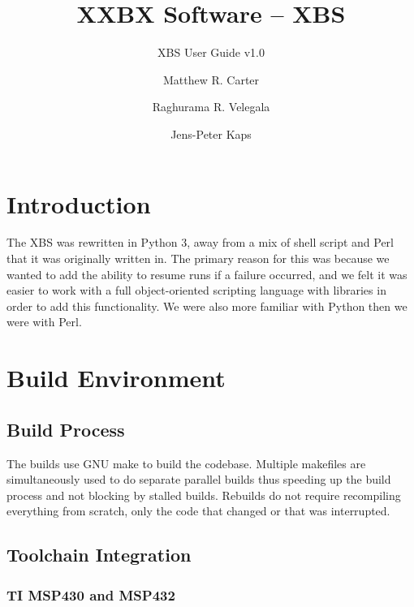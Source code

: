 \documentclass[twoside,11pt]{cergdoc}
\begin{document}
\title{XXBX Software -- XBS}
\subtitle{XBS User Guide v1.0}
\author{Matthew R. Carter \and Raghurama R. Velegala \and Jens-Peter Kaps}

\maketitle

\tableofcontents

\chapter{Introduction}
The XBS was rewritten in Python 3, away from a mix of shell script and
Perl that it was originally written in. The primary reason for this was because
we wanted to add the ability to resume runs if a failure occurred, and we felt
it was easier to work with a full object-oriented scripting language with
libraries in order to add this functionality. We were also more familiar with
Python then we were with Perl. 

\chapter{Build Environment}
  \section{Build Process}
The builds use GNU make to build
the codebase. Multiple makefiles are
simultaneously used to do separate parallel
builds thus speeding up the build process
and not blocking by stalled builds. Rebuilds
do not require recompiling everything from
scratch, only the code that changed or that
was interrupted.

  \section{Toolchain Integration}
    \subsection{TI MSP430 and MSP432}
\end{document}
